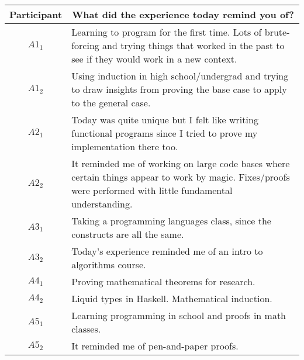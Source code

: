 \noindent
\begin{tabularx}{\linewidth}{@{}cX@{}}
  \toprule
  Participant & \multicolumn{1}{c}{
    \textbf{What did the experience today remind you of?}
  } \\ \midrule
  $A1_{1}$ & Learning to program for the first time. Lots of brute-forcing and trying things that worked in the past to see if they would work in a new context. \\
  $A1_{2}$ & Using induction in high school/undergrad and trying to draw insights from proving the base case to apply to the general case. \\
  $A2_{1}$ & Today was quite unique but I felt like writing functional programs since I tried to prove my implementation there too. \\
  $A2_{2}$ & It reminded me of working on large code bases where certain things appear to work by magic.  Fixes/proofs were performed with little fundamental understanding. \\
  $A3_{1}$ & Taking a programming languages class, since the constructs are all the same. \\
  $A3_{2}$ & Today's experience reminded me of an intro to algorithms course. \\
  $A4_{1}$ & Proving mathematical theorems for research. \\
  $A4_{2}$ & Liquid types in Haskell.  Mathematical induction. \\
  $A5_{1}$ & Learning programming in school and proofs in math classes. \\
  $A5_{2}$ & It reminded me of pen-and-paper proofs. \\
\end{tabularx}{\parfillskip=0pt\par}

\clearpage

